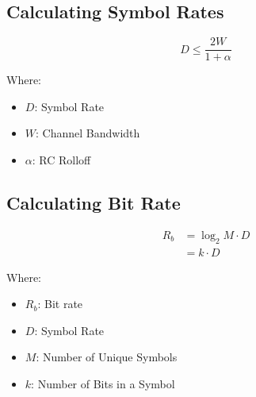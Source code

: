 \documentclass[10pt]{article}
\begin{document}
\subsection{Calculating Symbol Rates}
\[
    D \le \frac{2W}{1 + \alpha}
\]

\noindent Where:
\begin{itemize}
    \item $D$: Symbol Rate
    \item $W$: Channel Bandwidth
    \item $\alpha$: RC Rolloff
\end{itemize}

\subsection{Calculating Bit Rate}
\begin{align*}
    R_b &= \log_2{M} \cdot D \\ 
        &= k \cdot D
\end{align*}

\noindent Where:
\begin{itemize}
    \item $R_b$: Bit rate
    \item $D$: Symbol Rate
    \item $M$: Number of Unique Symbols
    \item $k$: Number of Bits in a Symbol
\end{itemize}

\newpage
\appendix
\end{document}
